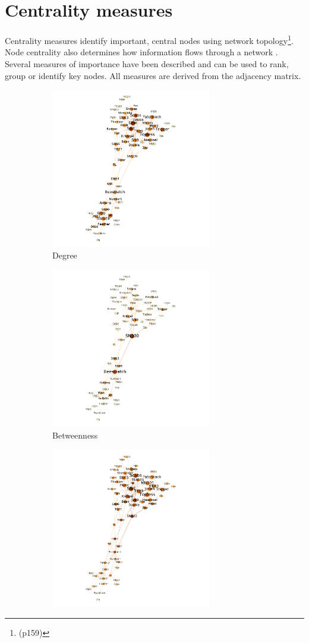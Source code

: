 \section{Centrality measures}
\label{sec:centrality measures}
Centrality measures identify important, central nodes  using  network topology\cite{newman2018networks}\footnote{(p159)}. Node centrality also determines how information flows through a network \cite{borgatti2005centrality}. Several measures of importance have been described and can be used to rank, group or identify key nodes. All measures are derived from the adjacency matrix. 

\begin{figure}
  \begin{subfigure}{7cm}
    \centering\includegraphics[width=7cm]{images/chapter3/dolphin/degree.png}
    \caption{Degree}
    \end{subfigure}
  \begin{subfigure}{7cm}
    \centering\includegraphics[width=7cm]{images/chapter3/dolphin/betweenness.png}
    \caption{Betweenness}
  \end{subfigure}
  \begin{subfigure}{7cm}
    \centering\includegraphics[width=7cm]{images/chapter3/dolphin/closeness.png}

\end{subfigure}
\end{figure}
